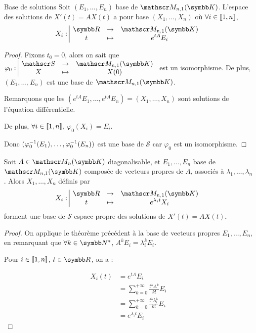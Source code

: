 \begin{theoreme}{Base de solutions}{}
    Soit $(E_1, \dots, E_n)$ base de $\mathscr M_{n, 1}(\K)$.
    L'espace des solutions de $X'(t) = A X(t)$ a pour base 
    $(X_1, \dots, X_n)$ où $\forall i \in [\![1, n]\!]$, $$\fonction{X_i}{\R}{\mathscr M_{n, 1}(\K)}{t}{e^{tA} E_i}$$
\end{theoreme}


\begin{proof}
    Fixons $t_0 = 0$, alors on sait que $\fonction{\varphi_0}{\mathscr S}{\mathscr M_{n, 1}(\K)}{X}{X(0)}$ 
    est un isomorphisme. De plus, $(E_1, \dots, E_n)$ est une base de $\mathscr M_{n, 1}(\K)$. 

    Remarquons que les $(e^{tA} E_1, \dots, e^{tA}E_n) = (X_1, \dots, X_n)$ sont solutions de l'équation différentielle.

    De plus, $\forall i \in [\![1, n]\!]$, $\varphi_0(X_i) = E_i$.

    Donc $(\varphi_0^{-1}(E_1), \dots, \varphi_0^{-1}(E_n))$ est une base de $\mathscr S$ car 
    $\varphi_0$ est un isomorphisme.
\end{proof}

\begin{corollaire}{}{}
    Soit $A \in \mathscr M_n(\K)$ diagonalisable, et $E_1, \dots, E_n$ base de $\mathscr M_{n, 1}(\K)$
    composée de vecteurs propres de $A$,
    associés à $\lambda_1, \dots, \lambda_n$. Alors $X_1, \dots, X_n$ définis par 
    $$\fonction{X_i}{\R}{\mathscr M_{n, 1}(\K)}{t}{e^{\lambda_i t} X_i}$$ forment une base 
    de $\mathscr S$ espace propre des solutions de $X'(t) = A X(t)$.
\end{corollaire}


\begin{proof}
    On applique le théorème précédent à la base de vecteurs propres $E_1, \dots, E_n$, en 
    remarquant que $\forall k \in \N^*$, $A^k E_i = \lambda_i^k E_i$.

    Pour $i \in [\![1, n]\!]$, $t \in \R$, on a : 

    \begin{align}
        X_i(t) & = e^{tA} E_i \\
        & = \sum_{k = 0}^{+ \infty} \frac{t^k A^k}{k!} E_i \\
        & = \sum_{k = 0}^{+ \infty} \frac{t^k \lambda_i^k}{k!} E_i \\
        & = e^{\lambda_i t} E_i
    \end{align}
\end{proof}


